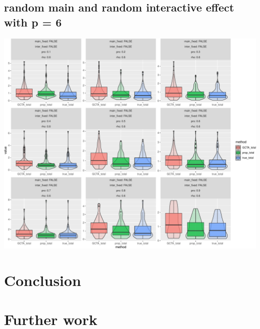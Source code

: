 \documentclass[]{article}
\begin{document}
\subsection{random main and random interactive effect with p =
6}\label{random-main-and-random-interactive-effect-with-p-6}

\includegraphics{Simulation_report_chi_resamle_files/figure-latex/random random p 6-1.pdf}

\section{Conclusion}\label{conclusion}

\section{Further work}\label{further-work}
\end{document}

